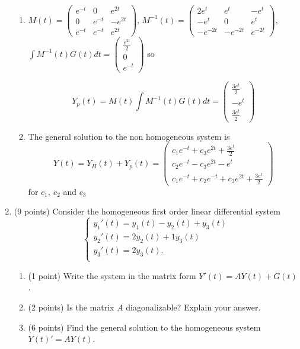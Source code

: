 \documentclass[11pt]{article}
\begin{document}
\begin{enumerate}
\begin{enumerate}
\item $M(t)=\begin{pmatrix}  e^{-t} &0 & e^{2t}  \\0&e^{-t}&-e^{2t} \\e^{-t}&e^{-t} &e^{2t}\end{pmatrix} $, $ M^{-1}(t)=\begin{pmatrix} 2e^t& e^t & -e^{t} \\ -e^t &  0 & e^t\\ -e^{-2t} &  -e^{-2t} &  e^{-2t} \end{pmatrix} $, $\int M^{-1}(t) G(t)dt=\begin{pmatrix}\frac{e^{2t}}{2}\\ 0 \\ e^{-t} \end{pmatrix} $ so


 \[ Y_p(t)=M(t)\int M^{-1}(t) G(t) dt=\begin{pmatrix}\frac{3e^t}{2}\\ -e^{t} \\ \frac{3e^t}{2} \end{pmatrix} \]


\item The general solution to the non homogeneous system is 
\[
Y(t)=Y_H(t)+Y_p(t)=\begin{pmatrix} c_1e^{-t}+c_3e^{2t} +\frac{3e^t}{2}\\c_2e^{-t}-c_3e^{2t}-e^{t}\\c_1e^{-t}+c_2e^{-t}+c_3e^{2t}+\frac{3e^t}{2}  \end{pmatrix} 
\]
for $c_1, \ c_2$ and $c_3$ 


\end{enumerate}

\newpage


 \item (9 points) Consider the homogeneous first order linear differential system
\begin{equation*}
  \left\{
        \begin{array}{l}
       y_1'(t)=y_1(t)-y_2(t)+y_3(t)\\
       y_2'(t)=2y_2(t)+1y_3(t)\\
       y_3'(t)=2y_3(t).\\
        \end{array}
    \right.
\end{equation*}




\begin{enumerate}
\item (1 point) Write the system in the matrix form $Y'(t)= AY(t)+G(t)$.
\item (2 points) Is the matrix $A$ diagonalizable? Explain your answer.
\item (6 points) Find the general solution to the homogeneous system $Y(t)'= AY(t)$. 
\end{enumerate}



\end{enumerate}
\end{document}
